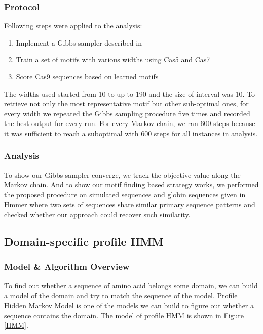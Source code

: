\documentclass[11pt, oneside]{article}
\begin{document}
\subsubsection{Protocol}

Following steps were applied to the analysis:
\begin{enumerate}
	\item Implement a Gibbs sampler described in 
	\item Train a set of motifs with various widths using Cas5 and Cas7
	\item Score Cas9 sequences based on learned motifs
\end{enumerate}
The widths used started from 10 to up to 190 and the size of interval was 10. To retrieve not only the most representative motif but other sub-optimal ones, for every width we repeated the Gibbs sampling procedure five times and recorded the best output for every run. For every Markov chain, we ran 600 steps because it was sufficient to reach a suboptimal with 600 steps for all instances in analysis.

\subsubsection{Analysis}
To show our Gibbs sampler converge, we track the objective value along the Markov chain. And to show our motif finding based strategy works, we performed the proposed procedure on simulated sequences and globin sequences given in Hmmer\cite{hmmer} where two sets of sequences share similar primary sequence patterns and checked whether our approach could recover such similarity.

\subsection{Domain-specific profile HMM}

\subsubsection{Model \& Algorithm Overview}
To find out whether a sequence of amino acid belongs some domain, we can build a model of the domain and try to match the sequence of the model. Profile Hidden Markov Model is one of the 
models we can build to figure out whether a sequence contains the domain. The model of profile HMM is shown in Figure \ref{HMM}. 
\end{document}
